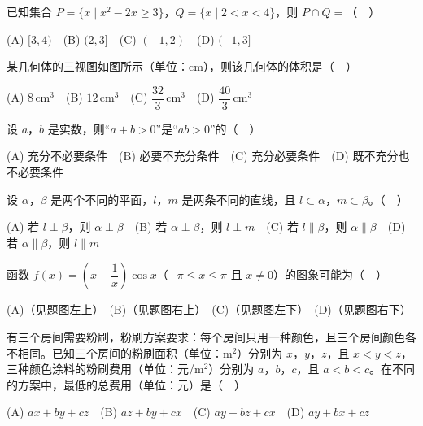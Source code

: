 

\begin{question}
已知集合 \(P=\{x\mid x^2-2x\geqslant 3\}\)，\(Q=\{x\mid 2<x<4\}\)，则 \(P\cap Q=\)（　）

(A) \([3,4)\)　(B) \((2,3]\)　(C) \((-1,2)\)　(D) \((-1,3]\)

\Needspace{0.4\textheight}
\end{question}
\begin{question}
某几何体的三视图如图所示（单位：\(\mathrm{cm}\)），则该几何体的体积是（　）
\nopagebreak[4]
\begin{center}\end{center}
\nopagebreak[4]
(A) \(8\,\mathrm{cm}^3\)　(B) \(12\,\mathrm{cm}^3\)　(C) \(\dfrac{32}{3}\,\mathrm{cm}^3\)　(D) \(\dfrac{40}{3}\,\mathrm{cm}^3\)

\end{question}
\begin{question}
设 \(a\)，\(b\) 是实数，则“\(a+b>0\)”是“\(ab>0\)”的（　）

(A) 充分不必要条件　(B) 必要不充分条件　(C) 充分必要条件　(D) 既不充分也不必要条件

\end{question}
\begin{question}
设 \(\alpha\)，\(\beta\) 是两个不同的平面，\(l\)，\(m\) 是两条不同的直线，且 \(l\subset\alpha\)，\(m\subset\beta\)。（　）

(A) 若 \(l\perp\beta\)，则 \(\alpha\perp\beta\)　(B) 若 \(\alpha\perp\beta\)，则 \(l\perp m\)　(C) 若 \(l\parallel\beta\)，则 \(\alpha\parallel\beta\)　(D) 若 \(\alpha\parallel\beta\)，则 \(l\parallel m\)

\Needspace{0.4\textheight}
\end{question}
\begin{question}
函数 \(f(x)=\left(x-\dfrac{1}{x}\right)\cos x\)（\(-\pi\leqslant x\leqslant\pi\) 且 \(x\neq0\)）的图象可能为（　）
\nopagebreak[4]
\begin{center}\end{center}
\nopagebreak[4]
(A)（见题图左上）　(B)（见题图右上）　(C)（见题图左下）　(D)（见题图右下）

\end{question}
\begin{question}
有三个房间需要粉刷，粉刷方案要求：每个房间只用一种颜色，且三个房间颜色各不相同。已知三个房间的粉刷面积（单位：\(\mathrm{m}^2\)）分别为 \(x\)，\(y\)，\(z\)，且 \(x<y<z\)，三种颜色涂料的粉刷费用（单位：元/\(\mathrm{m}^2\)）分别为 \(a\)，\(b\)，\(c\)，且 \(a<b<c\)。在不同的方案中，最低的总费用（单位：元）是（　）

(A) \(ax+by+cz\)　(B) \(az+by+cx\)　(C) \(ay+bz+cx\)　(D) \(ay+bx+cz\)

\Needspace{0.4\textheight}
\end{question}
